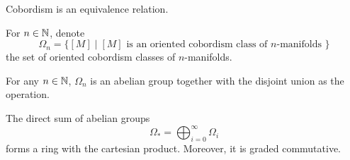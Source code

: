 \documentclass[a4paper]{article}
\begin{document}
\begin{lmm}{}{} Cobordism is an equivalence relation. 
\end{lmm}

\begin{defn}{}{} For $n\in\mathbb{N}$, denote $$\Omega_n=\{[M]\;|\;[M]\text{ is an oriented cobordism class of }n\text{-manifolds }\}$$ the set of oriented cobordism classes of $n$-manifolds. 
\end{defn}

\begin{lmm}{}{} For any $n\in\mathbb{N}$, $\Omega_n$ is an abelian group together with the disjoint union as the operation. 
\end{lmm}

\begin{prp}{}{} The direct sum of abelian groups $$\Omega_\ast=\bigoplus_{i=0}^\infty\Omega_i$$ forms a ring with the cartesian product. Moreover, it is graded commutative. 
\end{prp}
\end{document}
